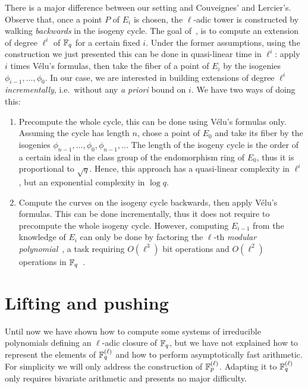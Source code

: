 \documentclass{sig-alternate}
\begin{document}
\begin{remark}
  \label{rk:cycle}
  There is a major difference between our setting and Couveignes' and
  Lercier's. Observe that, once a point $P$ of $E_i$ is chosen, the
  $\ell$-adic tower is constructed by walking \emph{backwards} in the
  isogeny cycle. The goal of~\cite{couveignes+lercier11}, is to
  compute an extension of degree $\ell^i$ of $\mathbb{F}_q$ for a certain
  fixed $i$. Under the former assumptions, using the construction we
  just presented this can be done in quasi-linear time in $\ell^i$:
  apply $i$ times Vélu's formulas, then take the fiber of a point of
  $E_i$ by the isogenies $\phi_{i-1}, \ldots, \phi_0$. In our case, we
  are interested in building extensions of degree $\ell^i$
  \emph{incrementally}, i.e.\ without any \emph{a priori} bound on
  $i$. We have two ways of doing this:
  \begin{enumerate}
  \item Precompute the whole cycle, this can be done using Vélu's
    formulas only. Assuming the cycle has length $n$, chose a point of
    $E_0$ and take its fiber by the isogenies $\phi_{n-1}, \ldots,
    \phi_0, \phi_{n-1}, \ldots$ The length of the isogeny cycle is the
    order of a certain ideal in the class group of the endomorphism
    ring of $E_0$, thus it is proportional to $\sqrt{q}$. Hence, this
    approach has a quasi-linear complexity in $\ell^i$, but an
    exponential complexity in $\log q$.
  \item Compute the curves on the isogeny cycle backwards, then apply
    Vélu's formulas. This can be done incrementally, thus it does not
    require to precompute the whole isogeny cycle. However, computing
    $E_{i-1}$ from the knowledge of $E_i$ can only be done by
    factoring the $\ell$-th \emph{modular polynomial}~\cite{schoof95},
    a task requiring $O(\ell^3)$ bit operations and $O(\ell^2)$
    operations in $\mathbb{F}_q$~\cite{sutherland10:modpol}.
  \end{enumerate}
\end{remark}


\section{Lifting and pushing}
\label{sec:lift-push}

Until now we have shown how to compute some systems of irreducible
polynomials defining an $\ell$-adic closure of $\mathbb{F}_q$, but we have not
explained how to represent the elements of $\mathbb{F}_q^{(\ell)}$ and how to
perform asymptotically fast arithmetic. For simplicity we will only
address the construction of $\mathbb{F}_p^{(\ell)}$. Adapting it to
$\mathbb{F}_q^{(\ell)}$ only requires bivariate arithmetic and presents no
major difficulty.
\end{document}
